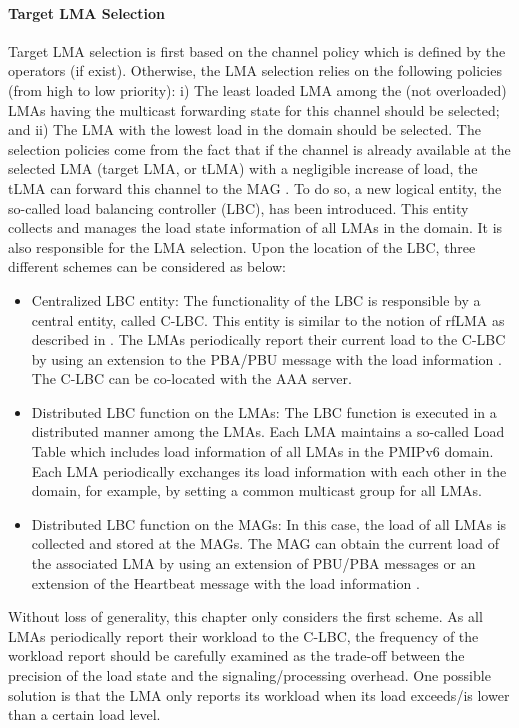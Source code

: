\paragraph{Target LMA Selection}
Target LMA selection is first based on the channel policy which is defined by the operators (if exist). Otherwise, the LMA selection relies on the following policies (from high to low priority):  i) The least loaded LMA among the (not overloaded) LMAs having the multicast forwarding state for this channel should be selected; and ii) The LMA with the lowest load in the domain should be selected. The selection policies come from the fact that if the channel is already available at the selected LMA (target LMA, or tLMA) with a negligible increase of load, the tLMA can forward this channel to the MAG \cite{developing_ip_multicast}. To do so, a new logical entity, the so-called load balancing controller (LBC), has been introduced. This entity collects and manages the load state information of all LMAs in the domain. It is also responsible for the LMA selection. 
Upon the location of the LBC, three different schemes can be considered as below:
\begin{itemize}
\item{Centralized LBC entity}: The functionality of the LBC is responsible by a central entity, called C-LBC. 
This entity is similar to the notion of rfLMA as described in \cite{runtime_lma}. The LMAs periodically report their current load to the C-LBC by using an extension to the PBA/PBU message with the load information \cite{runtime_lma}. The C-LBC can be co-located with the AAA server.
\item{Distributed LBC function on the LMAs}: The LBC function is executed in a distributed manner among the LMAs. Each LMA maintains a so-called Load Table which includes load information of all LMAs in the PMIPv6 domain. Each LMA periodically exchanges its load information with each other in the domain, for example, by setting a common multicast group for all LMAs.
\item{Distributed LBC function on the MAGs}: In this case, the load of all LMAs is collected and stored at the MAGs. The MAG can obtain the current load of the associated LMA by using an extension of PBU/PBA messages or an extension of the Heartbeat message with the load information \cite{lb-802.11}. 
\end{itemize}

Without loss of generality, this chapter only considers the first scheme. As all LMAs periodically report their workload to the C-LBC, the frequency of the workload report should be carefully examined as the trade-off between the precision of the load state and the signaling/processing overhead. One possible solution is that the LMA only reports its workload when its load exceeds/is lower than a certain load level. 

